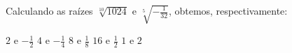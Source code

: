 Calculando as raízes $\sqrt[10]{1024}$ e $\sqrt[5]{-\frac{1}{32}}$, obtemos, respectivamente:

$2$ e $-\frac{1}{2}$
$4$ e $-\frac{1}{4}$
$8$ e $\frac{1}{8}$
$16$ e $\frac{1}{2}$
$1$ e $2$


